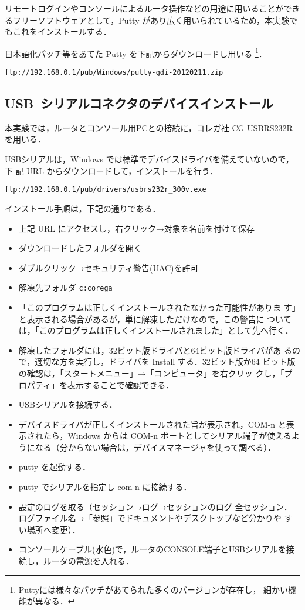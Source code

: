 リモートログインやコンソールによるルータ操作などの用途に用いることができ
るフリーソフトウェアとして，Putty があり広く用いられているため，本実験で
もこれをインストールする．

日本語化パッチ等をあてた Putty を下記からダウンロードし用いる
\footnote{Puttyには様々なパッチがあてられた多くのバージョンが存在し，
細かい機能が異なる．}．

\texttt{ftp://192.168.0.1/pub/Windows/putty-gdi-20120211.zip}

\subsection{USB--シリアルコネクタのデバイスインストール}
本実験では，ルータとコンソール用PCとの接続に，コレガ社 CG-USBRS232R を用いる．

USBシリアルは，Windows では標準でデバイスドライバを備えていないので，下
記 URL からダウンロードして，インストールを行う．

\texttt{ftp://192.168.0.1/pub/drivers/usbrs232r\_300v.exe}

インストール手順は，下記の通りである．

\begin{itemize}
 \item 上記 URL にアクセスし，右クリック→対象を名前を付けて保存
 \item ダウンロードしたフォルダを開く
 \item ダブルクリック→セキュリティ警告(UAC)を許可
 \item 解凍先フォルダ \texttt{c:\yen corega} 
 \item 「このプログラムは正しくインストールされたなかった可能性がありま
       す」と表示される場合があるが，単に解凍しただけなので，この警告に
       ついては，「このプログラムは正しくインストールされました」として先へ行く．
 \item 解凍したフォルダには，32ビット版ドライバと64ビット版ドライバがあ
       るので，適切な方を実行し，ドライバを Install する．32ビット版か64
       ビット版の確認は，「スタートメニュー」→「コンピュータ」を右クリッ
       クし，「プロパティ」を表示することで確認できる．
 \item USBシリアルを接続する．
 \item デバイスドライバが正しくインストールされた旨が表示され，COM-n 
と表示されたら，Windows からは COM-n ポートとしてシリアル端子が使えるよ
       うになる（分からない場合は，デバイスマネージャを使って調べる）．
 \item putty を起動する．
 \item putty でシリアルを指定し com n に接続する．
 \item 設定のログを取る（セッション→ログ→セッションのログ 全セッション．
       ログファイル名→「参照」でドキュメントやデスクトップなど分かりや
       すい場所へ変更）．
 \item コンソールケーブル(水色)で，ルータのCONSOLE端子とUSBシリアルを接
       続し，ルータの電源を入れる．
\end{itemize}

